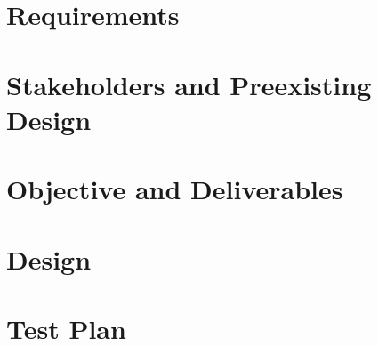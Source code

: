 \documentclass[hidelinks, 12pt]{article} %
\begin{document}
\section{ Requirements}
\label{Requirements}

\pagebreak
\newpage
\section{ Stakeholders and Preexisting Design}
\label{Stakeholders}

\pagebreak
\newpage
\section{Objective and Deliverables}
\label{Obj and deliv}

\pagebreak
% 
\newpage
\section{Design}
\label{Design}

\pagebreak
\newpage
\section{Test Plan}
\label{Test plan}

\pagebreak
\newpage
\end{document}
